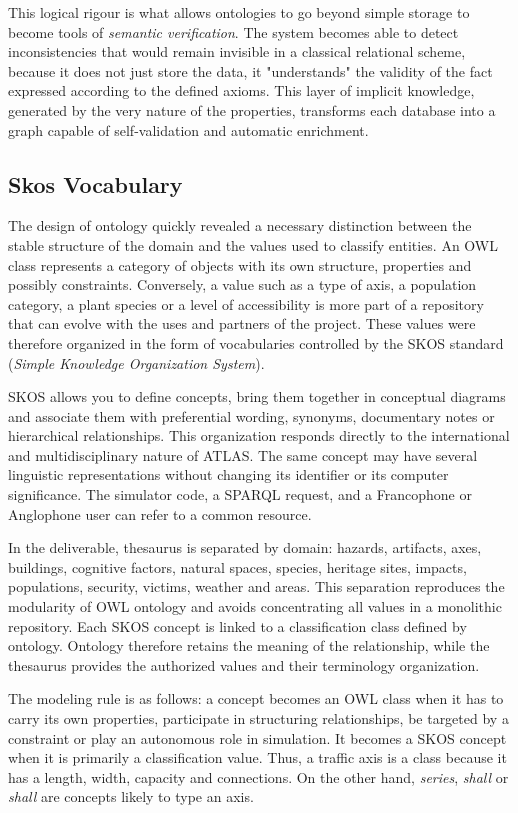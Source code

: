 \documentclass{article}
\begin{document}
This logical rigour is what allows ontologies to go beyond simple storage to become tools of \textit{semantic verification}. The system becomes able to detect inconsistencies that would remain invisible in a classical relational scheme, because it does not just store the data, it "understands" the validity of the fact expressed according to the defined axioms. This layer of implicit knowledge, generated by the very nature of the properties, transforms each database into a graph capable of self-validation and automatic enrichment.
\subsection{Skos Vocabulary}

The design of ontology quickly revealed a necessary distinction between the stable structure of the domain and the values used to classify entities. An OWL class represents a category of objects with its own structure, properties and possibly constraints. Conversely, a value such as a type of axis, a population category, a plant species or a level of accessibility is more part of a repository that can evolve with the uses and partners of the project. These values were therefore organized in the form of vocabularies controlled by the SKOS standard (\textit{Simple Knowledge Organization System}).

SKOS allows you to define concepts, bring them together in conceptual diagrams and associate them with preferential wording, synonyms, documentary notes or hierarchical relationships. This organization responds directly to the international and multidisciplinary nature of ATLAS. The same concept may have several linguistic representations without changing its identifier or its computer significance. The simulator code, a SPARQL request, and a Francophone or Anglophone user can refer to a common resource.

In the deliverable, thesaurus is separated by domain: hazards, artifacts, axes, buildings, cognitive factors, natural spaces, species, heritage sites, impacts, populations, security, victims, weather and areas. This separation reproduces the modularity of OWL ontology and avoids concentrating all values in a monolithic repository. Each SKOS concept is linked to a classification class defined by ontology. Ontology therefore retains the meaning of the relationship, while the thesaurus provides the authorized values and their terminology organization.

The modeling rule is as follows: a concept becomes an OWL class when it has to carry its own properties, participate in structuring relationships, be targeted by a constraint or play an autonomous role in simulation. It becomes a SKOS concept when it is primarily a classification value. Thus, a traffic axis is a class because it has a length, width, capacity and connections. On the other hand, \textit{series}, \textit{shall} or \textit{shall} are concepts likely to type an axis.
\end{document}

